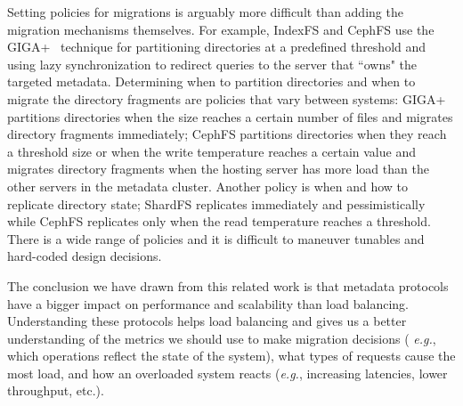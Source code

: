 Setting policies for migrations is arguably more difficult than adding the
migration mechanisms themselves.  For example, IndexFS and CephFS use the
GIGA+~\cite{patil:fast2011-giga} technique for partitioning directories at a predefined
threshold and using lazy synchronization to redirect queries to the server that
``owns" the targeted metadata.  Determining when to partition directories and
when to migrate the directory fragments are policies that vary between systems:
GIGA+ partitions directories when the size reaches a certain number of files
and migrates directory fragments immediately; CephFS partitions directories
when they reach a threshold size or when the write temperature reaches a
certain value and migrates directory fragments when the hosting server has more
load than the other servers in the metadata cluster. Another policy is when and
how to replicate directory state; ShardFS replicates immediately and
pessimistically while CephFS replicates only when the read temperature reaches
a threshold.  There is a wide range of policies and it is difficult to maneuver
tunables and hard-coded design decisions.

The conclusion we have drawn from this related work is that metadata protocols
have a bigger impact on performance and scalability than load balancing.  
Understanding these protocols helps load balancing and gives us a better
understanding of the metrics we should use to make migration decisions ({\it
e.g.}, which operations reflect the state of the system), what types of
requests cause the most load, and how an overloaded system reacts ({\it e.g.},
increasing latencies, lower throughput, etc.).



